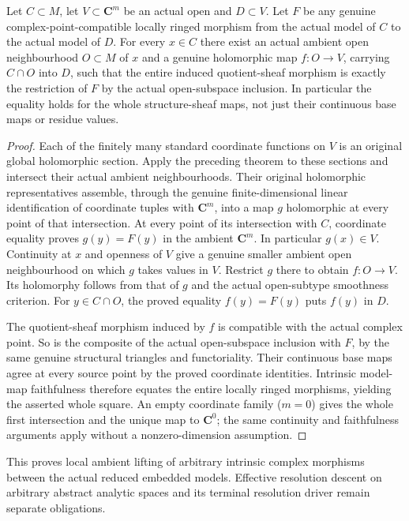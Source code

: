 \begin{theorem}
\label{hir:actual-analytic-subspace-intrinsic-local-holomorphic-lift}
\leanok
Let $C\subset M$, let $V\subset\mathbf C^m$ be an actual open and
$D\subset V$. Let $F$ be any genuine complex-point-compatible locally
ringed morphism from the actual model of $C$ to the actual model of $D$.
For every $x\in C$ there exist an actual ambient open neighbourhood
$O\subset M$ of $x$ and a genuine holomorphic map $f:O\to V$, carrying
$C\cap O$ into $D$, such that the entire induced quotient-sheaf morphism
is exactly the restriction of $F$ by the actual open-subspace inclusion.
In particular the equality holds for the whole structure-sheaf maps,
not just their continuous base maps or residue values.
\end{theorem}
\begin{proof}
Each of the finitely many standard coordinate functions on $V$ is an
original global holomorphic section. Apply the preceding theorem to these
sections and intersect their actual ambient neighbourhoods. Their original
holomorphic representatives assemble, through the genuine finite-dimensional
linear identification of coordinate tuples with $\mathbf C^m$, into a map
$g$ holomorphic at every point of that intersection. At every point of its
intersection with $C$, coordinate equality proves $g(y)=F(y)$ in the ambient
$\mathbf C^m$. In particular $g(x)\in V$. Continuity at $x$ and openness
of $V$ give a genuine smaller ambient open neighbourhood on which $g$ takes
values in $V$. Restrict $g$ there to obtain $f:O\to V$. Its holomorphy
follows from that of $g$ and the actual open-subtype smoothness criterion.
For $y\in C\cap O$, the proved equality $f(y)=F(y)$ puts $f(y)$ in $D$.

The quotient-sheaf morphism induced by $f$ is compatible with the actual
complex point. So is the composite of the actual open-subspace inclusion
with $F$, by the same genuine structural triangles and functoriality.
Their continuous base maps agree at every source point by the proved
coordinate identities. Intrinsic model-map faithfulness therefore equates
the entire locally ringed morphisms, yielding the asserted whole square.
An empty coordinate family ($m=0$) gives the whole first intersection and
the unique map to $\mathbf C^0$; the same continuity and faithfulness
arguments apply without a nonzero-dimension assumption.
\end{proof}

This proves local ambient lifting of arbitrary intrinsic complex morphisms
between the actual reduced embedded models. Effective resolution descent
on arbitrary abstract analytic spaces and its terminal resolution driver
remain separate obligations.

